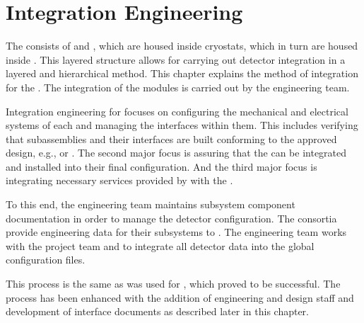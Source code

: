 \chapter{Integration Engineering}
\label{sec:fdsp-coord-integ-sysengr}


The   %
consists of %
 and , 
which are housed inside cryostats, which in turn are housed
inside .
 This layered structure allows for carrying out
detector integration in a layered and hierarchical method. %
This chapter explains the method of integration for the .
 The integration of the modules is carried out by the
 engineering team.

Integration engineering for  focuses on configuring the
mechanical and electrical systems of each  and managing
the interfaces within them. This includes verifying that subassemblies
and their interfaces are built conforming to the approved design,
e.g.,  or  . The second major focus
is assuring that the  can be integrated and
installed into their final configuration. And the third major focus is
integrating necessary services provided by  
with the .


To this end, the  engineering team maintains subsystem
component documentation in order to manage the detector
configuration. The consortia provide engineering data for their
subsystems to . The  engineering team works with
the  project team and  to integrate all detector
data into the global  configuration files.

This process is the same as was used for , which proved to be
successful. The process has been enhanced with the addition of engineering
and design staff and development of interface documents as described
later in this chapter. 

